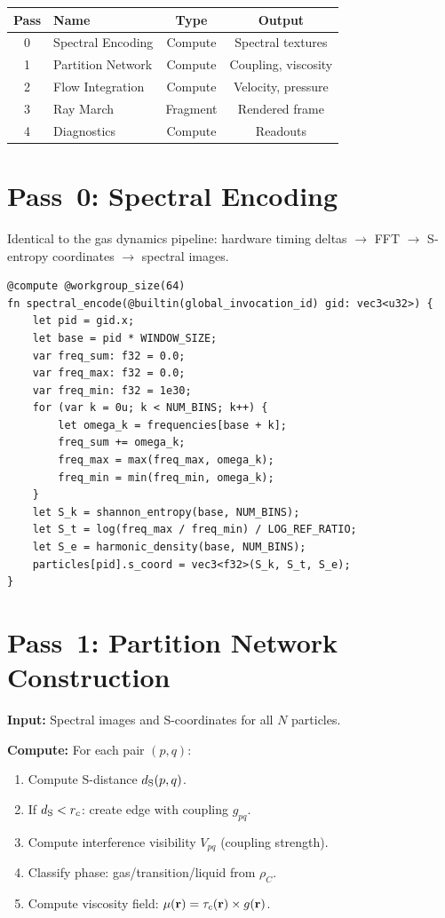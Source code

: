 \begin{center}
\begin{tabular}{clcc}
\toprule
\textbf{Pass} & \textbf{Name} & \textbf{Type} & \textbf{Output} \\
\midrule
0 & Spectral Encoding           & Compute  & Spectral textures \\
1 & Partition Network            & Compute  & Coupling, viscosity \\
2 & Flow Integration             & Compute  & Velocity, pressure \\
3 & Ray March                    & Fragment & Rendered frame \\
4 & Diagnostics                  & Compute  & Readouts \\
\bottomrule
\end{tabular}
\end{center}

\section{Pass~0: Spectral Encoding}
\label{sec:pass0}

Identical to the gas dynamics pipeline: hardware timing deltas $\to$ FFT $\to$ S-entropy coordinates $\to$ spectral images.

\begin{lstlisting}[style=wgsl,caption={Pass 0: Spectral Encoding (WGSL)}]
@compute @workgroup_size(64)
fn spectral_encode(@builtin(global_invocation_id) gid: vec3<u32>) {
    let pid = gid.x;
    let base = pid * WINDOW_SIZE;
    var freq_sum: f32 = 0.0;
    var freq_max: f32 = 0.0;
    var freq_min: f32 = 1e30;
    for (var k = 0u; k < NUM_BINS; k++) {
        let omega_k = frequencies[base + k];
        freq_sum += omega_k;
        freq_max = max(freq_max, omega_k);
        freq_min = min(freq_min, omega_k);
    }
    let S_k = shannon_entropy(base, NUM_BINS);
    let S_t = log(freq_max / freq_min) / LOG_REF_RATIO;
    let S_e = harmonic_density(base, NUM_BINS);
    particles[pid].s_coord = vec3<f32>(S_k, S_t, S_e);
}
\end{lstlisting}

\section{Pass~1: Partition Network Construction}
\label{sec:pass1}

\textbf{Input:} Spectral images and S-coordinates for all $N$ particles.

\textbf{Compute:} For each pair $(p, q)$:
\begin{enumerate}
    \item Compute S-distance $d_{\mathrm{S}}(p,q)$.
    \item If $d_{\mathrm{S}} < r_c$: create edge with coupling $g_{pq}$.
    \item Compute interference visibility $V_{pq}$ (coupling strength).
    \item Classify phase: gas/transition/liquid from $\rho_C$.
    \item Compute viscosity field: $\mu(\mathbf{r}) = \tau_c(\mathbf{r}) \times g(\mathbf{r})$.
\end{enumerate}

